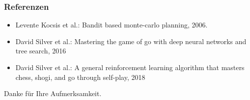 \begin{frame}
 \frametitle{Referenzen}
  


\begin{itemize}
  \item Levente Kocsis et al.: Bandit based monte-carlo planning, 2006.
  \item David Silver et al.: Mastering the game of go with deep neural networks and tree search, 2016
  \item David Silver et al.: A general reinforcement learning algorithm that masters chess, shogi, and go through self-play, 2018
\end{itemize}

\centering Danke für Ihre Aufmerksamkeit.


  
\end{frame}

